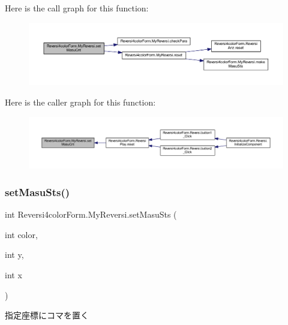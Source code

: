 Here is the call graph for this function\+:\nopagebreak
\begin{figure}[H]
\begin{center}
\leavevmode
\includegraphics[width=350pt]{class_reversi4color_form_1_1_my_reversi_ae612bc1a7a5ccbd972ce130de910e8e6_cgraph}
\end{center}
\end{figure}
Here is the caller graph for this function\+:\nopagebreak
\begin{figure}[H]
\begin{center}
\leavevmode
\includegraphics[width=350pt]{class_reversi4color_form_1_1_my_reversi_ae612bc1a7a5ccbd972ce130de910e8e6_icgraph}
\end{center}
\end{figure}
\mbox{\label{class_reversi4color_form_1_1_my_reversi_a7b7f5f6c8ea7961a41cb3dcc4360c9d1}} 
\subsubsection{\texorpdfstring{set\+Masu\+Sts()}{setMasuSts()}}
{\footnotesize\ttfamily int Reversi4color\+Form.\+My\+Reversi.\+set\+Masu\+Sts (\begin{DoxyParamCaption}\item[{int}]{color,  }\item[{int}]{y,  }\item[{int}]{x }\end{DoxyParamCaption})}



指定座標にコマを置く 


